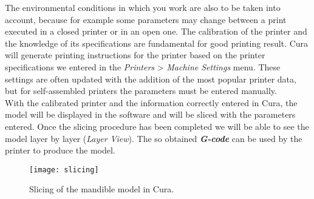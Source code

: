 The environmental conditions in which you work are also to be taken into account, because for example some parameters may change between a print executed in a closed printer or in an open one.
The calibration of the printer and the knowledge of its specifications are fundamental for good printing result. Cura will generate printing instructions for the printer based on the printer specifications we entered in the \emph{Printers} > \emph{Machine Settings} menu. These settings are often updated with the addition of the most popular printer data, but for self-assembled printers the parameters must be entered manually. \\
With the calibrated printer and the information correctly entered in Cura, the model will be displayed in the software and will be sliced with the parameters entered. Once the slicing procedure has been completed we will be able to see the model layer by layer (\emph{Layer View}).
The so obtained \emph{\textbf{G-code}} can be used by the printer to produce the model.

\begin{figure}[t]
\centering
\texttt{[image: slicing]}
\caption{Slicing of the mandible model in Cura.}
\label{fig:slicing}
\end{figure}

